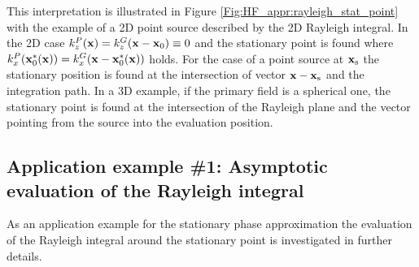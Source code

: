 This interpretation is illustrated in Figure \ref{Fig:HF_appr:rayleigh_stat_point} with the example of a 2D point source described by the 2D Rayleigh integral.
In the 2D case $k_z^P(\mathbf{x}) = k_z^G(\mathbf{x}-\mathbf{x}_0) \equiv 0$ and the stationary point is found where $k_x^P(\mathbf{x}_0^*(\mathbf{x})) = k_x^G(\mathbf{x}-\mathbf{x}_0^*(\mathbf{x}))$ holds.
For the case of a point source at $\mathbf{x}_{\mathrm{s}}$ the stationary position is found at the intersection of vector $\mathbf{x}-\mathbf{x}_{\mathrm{s}}$ and the integration path.
In a 3D example, if the primary field is a spherical one, the stationary point is found at the intersection of the Rayleigh plane and the vector pointing from the source into the evaluation position.

\subsection*{Application example \#1: Asymptotic evaluation of the Rayleigh integral}
\label{Sec:HF:RayleighSPA}
As an application example for the stationary phase approximation the evaluation of the Rayleigh integral around the stationary point is investigated in further details.

